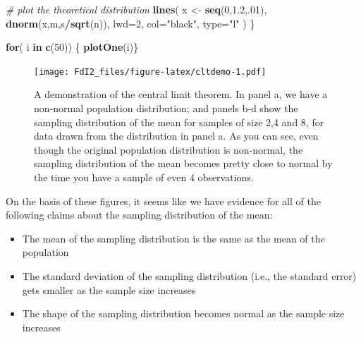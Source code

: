 \documentclass[spanish,]{book}
\newenvironment{Shaded}{\begin{snugshade}}{\end{snugshade}}
\newcommand{\KeywordTok}[1]{\textcolor[rgb]{0.13,0.29,0.53}{\textbf{#1}}}
\newcommand{\DataTypeTok}[1]{\textcolor[rgb]{0.13,0.29,0.53}{#1}}
\newcommand{\DecValTok}[1]{\textcolor[rgb]{0.00,0.00,0.81}{#1}}
\newcommand{\FloatTok}[1]{\textcolor[rgb]{0.00,0.00,0.81}{#1}}
\newcommand{\StringTok}[1]{\textcolor[rgb]{0.31,0.60,0.02}{#1}}
\newcommand{\CommentTok}[1]{\textcolor[rgb]{0.56,0.35,0.01}{\textit{#1}}}
\newcommand{\ControlFlowTok}[1]{\textcolor[rgb]{0.13,0.29,0.53}{\textbf{#1}}}
\newcommand{\OperatorTok}[1]{\textcolor[rgb]{0.81,0.36,0.00}{\textbf{#1}}}
\newcommand{\NormalTok}[1]{#1}
\providecommand{\tightlist}{%
  \setlength{\itemsep}{0pt}\setlength{\parskip}{0pt}}
\begin{document}
\begin{Shaded}
\begin{Highlighting}[]
        \CommentTok{# plot the theoretical distribution}
        \KeywordTok{lines}\NormalTok{( x <-}\StringTok{ }\KeywordTok{seq}\NormalTok{(}\DecValTok{0}\NormalTok{,}\FloatTok{1.2}\NormalTok{,.}\DecValTok{01}\NormalTok{), }\KeywordTok{dnorm}\NormalTok{(x,m,s}\OperatorTok{/}\KeywordTok{sqrt}\NormalTok{(n)), }
            \DataTypeTok{lwd=}\DecValTok{2}\NormalTok{, }\DataTypeTok{col=}\StringTok{"black"}\NormalTok{, }\DataTypeTok{type=}\StringTok{"l"}
\NormalTok{        )}
\NormalTok{    \}}
    
    \ControlFlowTok{for}\NormalTok{( i }\ControlFlowTok{in} \KeywordTok{c}\NormalTok{(}\DecValTok{50}\NormalTok{)) \{}
        \KeywordTok{plotOne}\NormalTok{(i)\}}
\end{Highlighting}
\end{Shaded}

\begin{figure}
\centering
\texttt{[image: FdI2\_files/figure-latex/cltdemo-1.pdf]}
\caption{\label{fig:cltdemo}A demonstration of the central limit theorem. In
panel a, we have a non-normal population distribution; and panels b-d
show the sampling distribution of the mean for samples of size 2,4 and
8, for data drawn from the distribution in panel a. As you can see, even
though the original population distribution is non-normal, the sampling
distribution of the mean becomes pretty close to normal by the time you
have a sample of even 4 observations.}
\end{figure}

On the basis of these figures, it seems like we have evidence for all of
the following claims about the sampling distribution of the mean:

\begin{itemize}
\tightlist
\item
  The mean of the sampling distribution is the same as the mean of the
  population
\item
  The standard deviation of the sampling distribution (i.e., the
  standard error) gets smaller as the sample size increases
\item
  The shape of the sampling distribution becomes normal as the sample
  size increases
\end{itemize}
\end{document}
